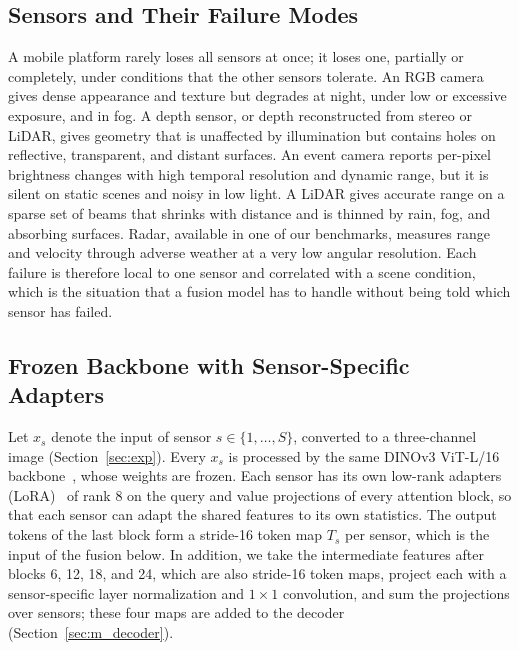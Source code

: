 \subsection{Sensors and Their Failure Modes}\label{sec:m_sensors}
A mobile platform rarely loses all sensors at once; it loses one, partially or completely, under conditions that the other sensors tolerate. An RGB camera gives dense appearance and texture but degrades at night, under low or excessive exposure, and in fog. A depth sensor, or depth reconstructed from stereo or LiDAR, gives geometry that is unaffected by illumination but contains holes on reflective, transparent, and distant surfaces. An event camera reports per-pixel brightness changes with high temporal resolution and dynamic range, but it is silent on static scenes and noisy in low light. A LiDAR gives accurate range on a sparse set of beams that shrinks with distance and is thinned by rain, fog, and absorbing surfaces. Radar, available in one of our benchmarks, measures range and velocity through adverse weather at a very low angular resolution. Each failure is therefore local to one sensor and correlated with a scene condition, which is the situation that a fusion model has to handle without being told which sensor has failed.

\subsection{Frozen Backbone with Sensor-Specific Adapters}\label{sec:m_backbone}
Let $x_s$ denote the input of sensor $s\in\{1,\dots,S\}$, converted to a three-channel image (Section~\ref{sec:exp}). Every $x_s$ is processed by the same DINOv3 ViT-L/16 backbone~\cite{dinov3_2025}, whose weights are frozen. Each sensor has its own low-rank adapters (LoRA)~\cite{lora2022} of rank 8 on the query and value projections of every attention block, so that each sensor can adapt the shared features to its own statistics. The output tokens of the last block form a stride-16 token map $T_s$ per sensor, which is the input of the fusion below. In addition, we take the intermediate features after blocks 6, 12, 18, and 24, which are also stride-16 token maps, project each with a sensor-specific layer normalization and $1\times1$ convolution, and sum the projections over sensors; these four maps are added to the decoder (Section~\ref{sec:m_decoder}).

